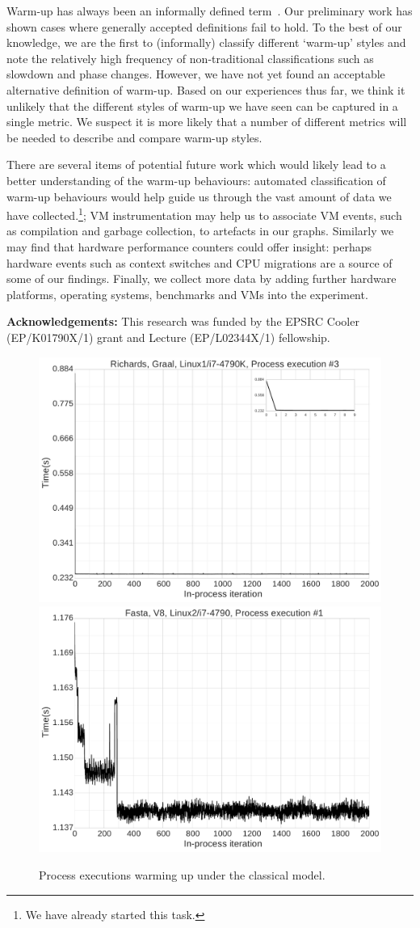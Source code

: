 \documentclass[preprint]{sigplanconf}
\begin{document}
Warm-up has always been an informally defined term~\cite{seaton15phd}. Our
preliminary work has shown cases where generally accepted definitions fail to hold.
To the best of our knowledge, we are the first to (informally) classify different
`warm-up' styles and note the relatively high frequency of non-traditional
classifications such as slowdown and phase changes.
However, we have not yet found an acceptable alternative definition of warm-up.
Based on our experiences thus far, we think it unlikely that the different
styles of warm-up we have seen can be captured in a single metric. We suspect it
is more likely that a number of different metrics will be needed to describe and
compare warm-up styles.

There are several items of potential future work which would likely lead to a
better understanding of the warm-up behaviours: automated classification of
warm-up behaviours would help guide us through the vast amount of data we have
collected.\footnote{We have already started this task.}; VM instrumentation may
help us to associate VM events, such as compilation and garbage collection, to
artefacts in our graphs. Similarly we may find that hardware performance
counters could offer insight: perhaps hardware events such as context
switches and CPU migrations are a source of some of our findings. Finally, we
collect more data by adding further hardware platforms, operating systems,
benchmarks and VMs into the experiment.

\textbf{Acknowledgements:} This research was funded by the EPSRC Cooler
(EP/K01790X/1) grant and Lecture (EP/L02344X/1) fellowship.





\begin{figure}
\includegraphics[width=.5\textwidth]{examples_v2_results/good_fast.pdf}
\includegraphics[width=.5\textwidth]{examples_v2_results/good_tiers.pdf}
\caption{Process executions warming up under the classical model.}
\label{fig:good1}
\end{figure}
\end{document}

